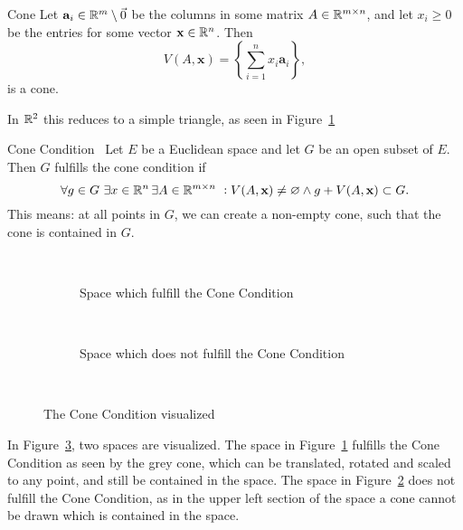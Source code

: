 \begin{defn}{Cone}
Let $\mathbf{a}_i\in\mathbb{R}^m\setminus\vec{0}$ be the columns in some matrix 
$A\in \mathbb{R}^{m \times n}$, and let $x_i\geq 0$ be the entries for some vector $\mathbf{x}\in \mathbb{R}^n$.
 Then
\begin{equation*}
    V(A,\mathbf{x}) =\left \{ \sum_{i=1}^{n} x_i \mathbf{a}_i \right \},
\end{equation*}
is a cone. 
\end{defn}
In $\mathbb{R}^2$ this reduces to a simple triangle, as seen in Figure~\ref{fig:cone_condition_true}
\begin{defn}{Cone Condition}~\label{def:cone_condition}
    Let $E$ be a Euclidean space and let $G$ be an open subset of $E$.
    Then $G$ fulfills the cone condition if
    \begin{equation*}
        \forall g \in G\,\, \exists x\in \RR^n
        \, \exists A\in \RR^{m \times n} \,\, :
        V(A,\mathbf{x})\neq \varnothing \land
        g + V(A, \mathbf{x}) \subset G. %
    \end{equation*}
    This means: at all points in $G$, we can create a non-empty cone,
     such that the cone is contained 
    in $G$.
\end{defn}

\begin{figure}[H]
    \centering
    \begin{subfigure}{.3\textwidth}
        \centering
        
        \caption{Space which fulfill the Cone Condition}~\label{fig:cone_condition_true}
      \end{subfigure}
    \begin{subfigure}{.3\textwidth}
        \centering
        
        \caption{Space which does not fulfill the Cone Condition}~\label{fig:cone_condition_false}
      \end{subfigure}
      \caption{The Cone Condition visualized}~\label{fig:cone_condition_visu}
\end{figure}
In Figure~\ref{fig:cone_condition_visu}, two spaces are visualized.
 The space in Figure~\ref{fig:cone_condition_true} fulfills the Cone Condition as seen 
 by the grey cone, which can be translated, rotated and scaled to any point, and still 
 be contained in the space. The space  
 in Figure~\ref{fig:cone_condition_false} does not fulfill the Cone Condition, as
in the upper left section of the space a cone cannot be drawn which is contained in the space.

